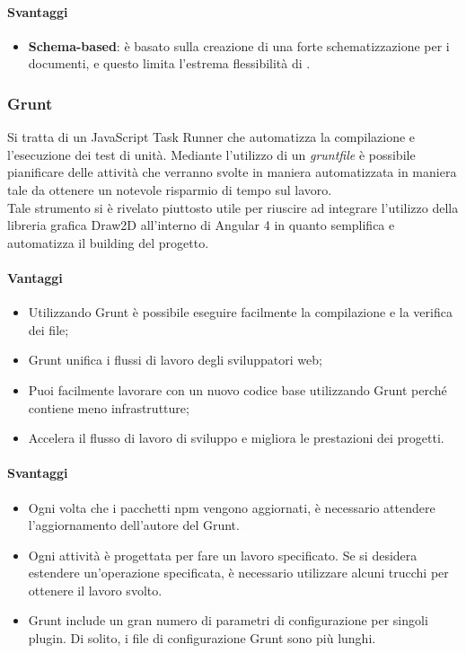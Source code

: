 \paragraph{Svantaggi}
\begin{itemize}
\item \textbf{Schema-based}: è basato sulla creazione di una forte schematizzazione per i
documenti, e questo limita l’estrema flessibilità di .
\end{itemize}

\subsubsection{Grunt}
Si tratta di un JavaScript Task Runner che automatizza la compilazione e l'esecuzione dei test di unità.
Mediante l'utilizzo di un \emph{gruntfile} è possibile pianificare delle attività che verranno svolte in maniera automatizzata in maniera tale da ottenere un notevole risparmio
di tempo sul lavoro.\\
Tale strumento si è rivelato piuttosto utile per riuscire ad integrare l'utilizzo della libreria grafica Draw2D all'interno di Angular 4 in quanto semplifica e automatizza il building
del progetto.
\paragraph{Vantaggi}
\begin{itemize}
\item Utilizzando Grunt è possibile eseguire facilmente la compilazione e la verifica dei file;
\item Grunt unifica i flussi di lavoro degli sviluppatori web;
\item Puoi facilmente lavorare con un nuovo codice base utilizzando Grunt perché contiene meno infrastrutture;
\item Accelera il flusso di lavoro di sviluppo e migliora le prestazioni dei progetti.
\end{itemize}

\paragraph{Svantaggi}
\begin{itemize}
\item Ogni volta che i pacchetti npm vengono aggiornati, è necessario attendere l'aggiornamento dell'autore del Grunt.

\item Ogni attività è progettata per fare un lavoro specificato. Se si desidera estendere un'operazione specificata, è necessario utilizzare alcuni trucchi per ottenere il lavoro svolto.

\item Grunt include un gran numero di parametri di configurazione per singoli plugin. Di solito, i file di configurazione Grunt sono più lunghi.

\end{itemize}


